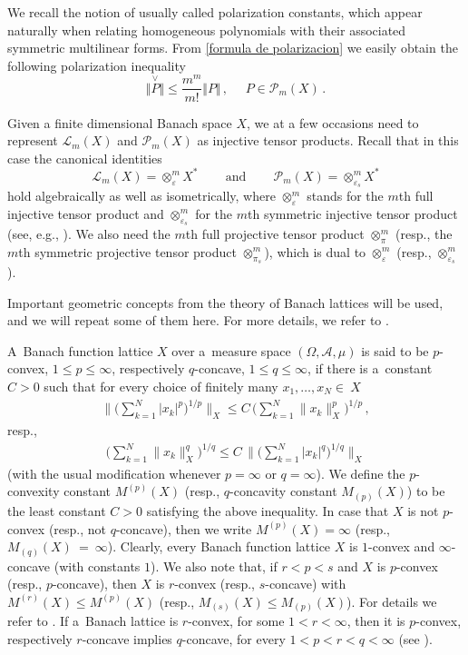 \documentclass[12pt]{amsart}
\numberwithin{subsection}{section}
\theoremstyle{definition}
\theoremstyle{remark}
\begin{document}
We recall the notion of usually called polarization constants, which appear naturally  when relating homogeneous polynomials with their associated
symmetric multilinear forms. From  \eqref{formula de polarizacion} we easily obtain the  following polarization inequality
\begin{equation*}
\Vert \overset{\vee}{P} \Vert \leq \frac{m^m}{m!} \Vert P \Vert\,,\,\,\,\,\,\,\,\,P \in \mathcal P_m(X)\,.
\end{equation*}

Given  a finite dimensional Banach space $X$, we at a few occasions  need to represent  $\mathcal L_m(X)$ and $\mathcal P_m(X)$
as injective tensor products. Recall that in this case the canonical identities
\[
\mathcal{L}_m(X) = \otimes_\varepsilon^m X^\ast
\,\,\,\,\,\,\,\,\,\,\, \text{ and } \,\,\,\,\,\,\,\,\,\,\,
\mathcal{P}_m(X) = \otimes_{\varepsilon_s}^m X^\ast
\]
hold algebraically as well as isometrically, where $\otimes_\varepsilon^m$ stands for the $m$th full injective tensor product and $\otimes_{\varepsilon_s}^m$ for the $m$th symmetric  injective tensor product (see, e.g., \cite{floret1997natural}). We also need
the $m$th full projective  tensor product $\otimes_\pi^m$ (resp., the $m$th symmetric  projective tensor product $\otimes_{\pi_s}^m$),
which is dual to $\otimes_\varepsilon^m$ (resp., $\otimes_{\varepsilon_s}^m$).

\vspace{15 mm}

Important geometric concepts from the theory of Banach lattices will be used, and we will repeat some of them here. For more details, we refer to \cite{LT1, LT}.


A~Banach function lattice $X$ over a~measure space $(\Omega, \mathcal{A}, \mu)$ is said to be $p$-convex, $1 \leq p \leq \infty$, respectively $q$-concave,
$1 \leq q \leq \infty$, if there is a~constant $C>0$ such that for every choice of finitely many $x_1,\ldots, x_N \in~X$
\begin{align*}
\Big\|\Big(\sum_{k=1}^{N} |x_k|^p \Big)^{1/p}\Big\|_X \le C \, \Big (\sum^{N}_{k=1}\|x_k\|_X^p \Big)^{1/p}\,,
\end{align*}
resp.,
\begin{align*}
\Big (\sum^{N}_{k=1}\|x_k\|_X^q \Big) ^{1/q}
\le C \, \Big\|\Big(\sum_{k=1}^{N}|x_k|^q \Big)^{1/q}\Big\|_{X}
\end{align*}
(with the usual modification whenever $p= \infty$ or $q= \infty$). We define the $p$-convexity constant $M^{(p)}(X)$ (resp.,
$q$-concavity constant $M_{(p)}(X)$) to be the least constant $C>0$ satisfying the above inequality. In case that $X$ is not
$p$-convex (resp., not $q$-concave), then we write $M^{(p)}(X) = \infty$ (resp., $M_{(q)}(X)~=~\infty$).
Clearly, every Banach function lattice $X$ is $1$-convex and $\infty$-concave (with constants $1$). We also note that, if
$r < p < s$ and  $X$ is $p$-convex (resp., $p$-concave), then $X$ is $r$-convex (resp., $s$-concave) with $M^{(r)}(X) \le M^{(p)}(X)$
(resp., $M_{(s)}(X) \le M_{(p)}(X)$). For details we refer to \cite[Proposition 1.d.5]{LT1}. If a~Banach lattice is $r$-convex,
for some $1<r<\infty$, then it is $p$-convex, respectively $r$-concave implies $q$-concave, for every $1 < p < r < q <\infty$
(see \cite[Theorem 1.f.7]{LT1}).
\end{document}
